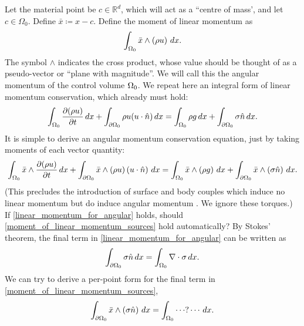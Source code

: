 Let the material point be $c \in \mathbb{R}^d$, which will act as a ``centre of mass', and let $c \in \Omega_0$.
Define $\bar{x} \coloneqq x - c$.
Define the moment of linear momentum as
\begin{equation}\label{moment_of_linear_momentum}
    \int_{{\Omega_0}} \bar{x} \wedge \left(\rho u\right)\,dx.
\end{equation}
The symbol $\wedge$ indicates the cross product, whose value should be thought of as a pseudo-vector or ``plane with magnitude''.
We will call this the angular momentum of the control volume ${\Omega_0}$.
We repeat here an integral form of linear momentum conservation, which already must hold:
\begin{equation}\label{linear_momentum_for_angular}
    \int_{{\Omega_0}} \frac{\partial (\rho u)}{\partial t}\,dx + \int_{{\partial\Omega_0}} \rho u (u\cdot \hat{n})\,dx
    = \int_{{\Omega_0}} \rho g\,dx + \int_{{\partial\Omega_0}} \sigma \hat{n}\,dx.
\end{equation}
It is simple to derive an angular momentum conservation equation, just by taking moments of each vector quantity:
\begin{equation}\label{moment_of_linear_momentum_sources}
    \int_{{\Omega_0}} \bar{x} \wedge \frac{\partial (\rho u)}{\partial t}\,dx + \int_{{\partial\Omega_0}} \bar{x} \wedge \left(\rho u\right)\left(u\cdot \hat{n}\right)\,dx
    = \int_{{\Omega_0}} \bar{x} \wedge \left(\rho g\right)\,dx + \int_{{\partial\Omega_0}} \bar{x} \wedge \left(\sigma \hat{n}\right)\,dx.
\end{equation}
(This precludes the introduction of surface and body couples which induce no linear momentum but do induce angular momentum
\cite{leal}. We ignore these torques.)
\\
If \eqref{linear_momentum_for_angular} holds, should \eqref{moment_of_linear_momentum_sources} hold automatically?
% 
By Stokes' theorem, the final term in \eqref{linear_momentum_for_angular} can be written as
\begin{align*}
    \int_{{\partial\Omega_0}} \sigma\hat{n}\,dx = \int_{\Omega_0}\nabla\cdot\sigma\,dx.
\end{align*}
We can try to derive a per-point form for the final term in \eqref{moment_of_linear_momentum_sources},
\begin{align*}
    \int_{{\partial\Omega_0}} \bar{x} \wedge \left(\sigma\hat{n}\right)\,dx = \int_{\Omega_0}\cdots ? \cdots\,dx.
\end{align*}
